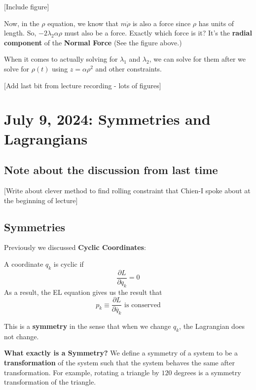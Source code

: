 \documentclass[11pt]{article}
\begin{document}
[Include figure]

\begin{redbox}
  Now, in the $\rho$ equation, we know that $m\ddot{\rho}$ is also a force since $\rho$ has units of length. So, $-2\lambda_2 \alpha \rho$ must also be a force. Exactly which force is it? It's the \textbf{radial component} of the \textbf{Normal Force} (See the figure above.)
\end{redbox}

\vskip 0.5cm
\begin{bluebox}
  When it comes to actually solving for $\lambda_1$ and $\lambda_2$, we can solve for them after we solve for $\rho(t)$ using $z = \alpha \rho^2$ and other constraints.
\end{bluebox}

\vskip 0.5cm
[Add last bit from lecture recording - lots of figures]

\pagebreak
\section{July 9, 2024: Symmetries and Lagrangians}

\subsection{Note about the discussion from last time}
[Write about clever method to find rolling constraint that Chien-I spoke about at the beginning of lecture]

\vskip 0.5cm
\subsection{Symmetries}
Previously we discussed \textbf{Cyclic Coordinates}: 
\begin{redbox}
  A coordinate $q_{k}$ is cyclic if 
  \[ \frac{\partial L}{\partial q_{k}} = 0\]
  As a result, the EL equation gives us the result that 
  \[ p_{k} \equiv \frac{\partial L}{\partial \dot{q_{k}}} \text{ is conserved} \]
\end{redbox}

\begin{bluebox}
  This is a \textbf{symmetry} in the sense that when we change $q_{k}$, the Lagrangian does not change.
\end{bluebox}

\vskip 0.5cm
\textbf{What exactly is a Symmetry?}
We define a symmetry of a system to be a \textbf{transformation} of the system such that the system behaves the same after transformation. For example, rotating a triangle by $120$ degrees is a symmetry transformation of the triangle.
\end{document}
